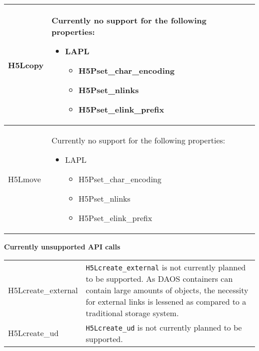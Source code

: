 \documentclass[../users_guide.tex]{subfiles}
\begin{document}
\begin{center}
\begin{tabularx}{\linewidth}{| X | >{\RaggedRight}X |}
H5Lcopy & Currently no support for the following properties:
\begin{itemize}
 \item LAPL
 \begin{itemize}
  \item H5Pset\_char\_encoding\footnotemark[1]
  \item H5Pset\_nlinks
  \item H5Pset\_elink\_prefix\footnotemark[2]
 \end{itemize}
\end{itemize}\\ \hline
H5Lmove & Currently no support for the following properties:
\begin{itemize}
 \item LAPL
 \begin{itemize}
  \item H5Pset\_char\_encoding\footnotemark[1]
  \item H5Pset\_nlinks
  \item H5Pset\_elink\_prefix\footnotemark[2]
 \end{itemize}
\end{itemize}\\ \hline

\end{tabularx}

\textbf{Currently unsupported API calls}
\vspace{.2in} \\

\begin{tabularx}{\linewidth}{| X | >{\RaggedRight}X |}
\hline
\rowcolor{lightgray!50}%
\multicolumn{1}{| c |}{\textbf{API call}} & \multicolumn{1}{c |}{\textbf{Notes}} \\ \hline

H5Lcreate\_external & \texttt{H5Lcreate\_external} is not currently planned to be supported. As DAOS containers can contain large amounts of objects, the necessity for external links is lessened as compared to a traditional storage system. \\ \hline
H5Lcreate\_ud & \texttt{H5Lcreate\_ud} is not currently planned to be supported.\\ \hline

\end{tabularx}


\end{center}
\end{document}
